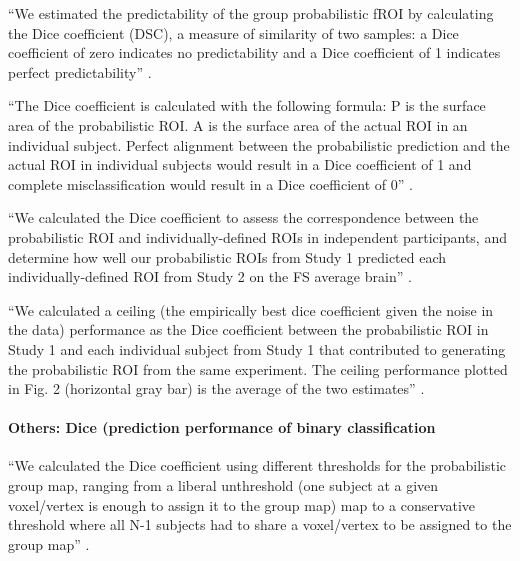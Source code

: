 ``We estimated the predictability of the group probabilistic fROI by calculating
the Dice coefficient (DSC), a measure of similarity of two samples:
%
a Dice coefficient of zero indicates no predictability and a Dice coefficient of
1 indicates perfect predictability'' \citep{rosenke2021probabilistic}.

``The Dice coefficient is calculated with the following formula:
%
P is the surface area of the probabilistic ROI.
%
A is the surface area of the actual ROI in an individual subject.
%
Perfect alignment between the probabilistic prediction and the actual ROI in
individual subjects would result in a Dice coefficient of 1 and complete
misclassification would result in a Dice coefficient of 0''
\citep{weiner2018defining}.


``We calculated the Dice coefficient to assess the correspondence between the
probabilistic ROI and individually-defined ROIs in independent participants, and
determine how well our probabilistic ROIs from Study 1 predicted each
individually-defined ROI from Study 2 on the FS average brain''
\citep{weiner2018defining}.

``We calculated a ceiling (the empirically best dice coefficient given the noise
in the data) performance as the Dice coefficient between the probabilistic ROI
in Study 1 and each individual subject from Study 1 that contributed to
generating the probabilistic ROI from the same experiment.
%
The ceiling performance plotted in Fig. 2 (horizontal gray bar) is the average
of the two estimates'' \citep{weiner2018defining}.


\paragraph{Others: Dice (prediction performance of binary classification}



``We calculated the Dice coefficient using different thresholds for the
probabilistic group map, ranging from a liberal unthreshold (one subject at a
given voxel/vertex is enough to assign it to the group map) map to a
conservative threshold where all N-1 subjects had to share a voxel/vertex to be
assigned to the group map'' \citet{rosenke2021probabilistic}.


